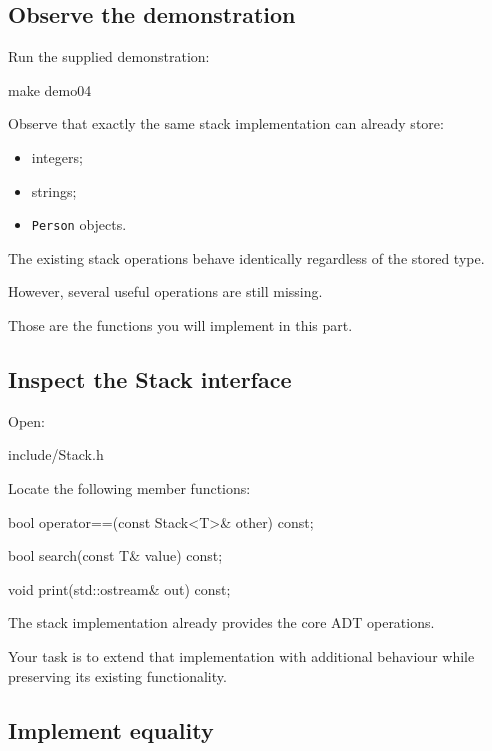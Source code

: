 \documentclass{csc2059practical}
\begin{document}
\subsection{Observe the demonstration}

Run the supplied demonstration:

\begin{terminal}
make demo04
\end{terminal}

Observe that exactly the same stack implementation can already store:

\begin{itemize}
    \item integers;
    \item strings;
    \item \texttt{Person} objects.
\end{itemize}

The existing stack operations behave identically regardless of the stored type.

However, several useful operations are still missing.

Those are the functions you will implement in this part.

\subsection{Inspect the Stack interface}

Open:

\begin{terminal}
include/Stack.h
\end{terminal}

Locate the following member functions:

\begin{cppcode}
bool operator==(const Stack<T>& other) const;

bool search(const T& value) const;

void print(std::ostream& out) const;
\end{cppcode}

The stack implementation already provides the core ADT operations.

Your task is to extend that implementation with additional behaviour while preserving its existing functionality.

\subsection{Implement equality}
\end{document}
